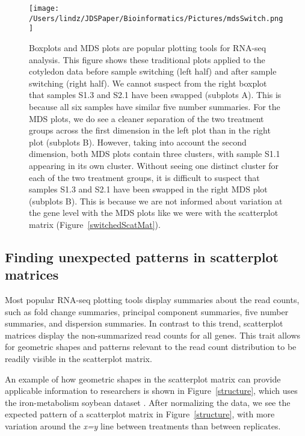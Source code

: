 \documentclass{bioinfo}
\begin{document}
\begin{figure}[!tpb]
\centerline{\texttt{[image: /Users/lindz/JDSPaper/Bioinformatics/Pictures/mdsSwitch.png]}}
\caption{Boxplots and MDS plots are popular plotting tools for RNA-seq analysis. This figure shows these traditional plots applied to the cotyledon data before sample switching (left half) and after sample switching (right half). We cannot suspect from the right boxplot that samples S1.3 and S2.1 have been swapped (subplots A). This is because all six samples have similar five number summaries. For the MDS plots, we do see a cleaner separation of the two treatment groups across the first dimension in the left plot than in the right plot (subplots B). However, taking into account the second dimension, both MDS plots contain three clusters, with sample S1.1 appearing in its own cluster. Without seeing one distinct cluster for each of the two treatment groups, it is difficult to suspect that samples S1.3 and S2.1 have been swapped in the right MDS plot (subplots B). This is because we are not informed about variation at the gene level with the MDS plots like we were with the scatterplot matrix (Figure~\ref{switchedScatMat}).
\label{mdsSwitch}}
\end{figure}

\subsection{Finding unexpected patterns in scatterplot matrices}

Most popular RNA-seq plotting tools display summaries about the read counts, such as fold change summaries, principal component summaries, five number summaries, and dispersion summaries. In contrast to this trend, scatterplot matrices display the non-summarized read counts for all genes. This trait allows for geometric shapes and patterns relevant to the read count distribution to be readily visible in the scatterplot matrix.

An example of how geometric shapes in the scatterplot matrix can provide applicable information to researchers is shown in Figure~\ref{structure}, which uses the iron-metabolism soybean dataset \citep{Lauter}. After normalizing the data, we see the expected pattern of a scatterplot matrix in Figure~\ref{structure}, with more variation around the \textit{x=y} line between treatments than between replicates. 
\end{document}
